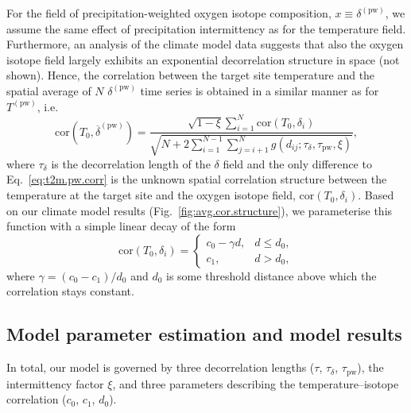 \documentclass[cp, manuscript, draft]{copernicus}
\begin{document}
For the field of precipitation-weighted oxygen isotope composition, $x \equiv
\delta^{\mathrm{(pw)}}$, we assume the same effect of precipitation
intermittency as for the temperature field. Furthermore, an analysis of the
climate model data suggests that also the oxygen isotope field largely exhibits
an exponential decorrelation structure in space (not shown). Hence, the
correlation between the target site temperature and the spatial average of $N$
$\delta^{\mathrm{(pw)}}$ time series is obtained in a similar manner as for
$T^{\mathrm{(pw)}}$, i.e.
%
\begin{equation}
\label{eq:oxy.pw.corr}
\mathrm{cor}\left(T_0,
  \overline{\delta}^{\mathrm{(pw)}}\right)=
\frac
{\sqrt{1-\xi}\sum_{i=1}^{N}\mathrm{cor}\left(T_0,\delta_i\right)}
{\sqrt{N + 2\sum_{i=1}^{N-1}\sum_{j=i+1}^{N}
  g(d_{ij}; \tau_{\delta}, \tau_{\mathrm{pw}}, \xi)}},
\end{equation}
%
where $\tau_{\delta}$ is the decorrelation length of the $\delta$ field and the
only difference to Eq.~\eqref{eq:t2m.pw.corr} is the unknown spatial correlation
structure between the temperature at the target site and the oxygen isotope
field, $\mathrm{cor}\left(T_0,\delta_i\right)$.  Based on our climate model
results (Fig.~\ref{fig:avg.cor.structure}), we parameterise this function with a
simple linear decay of the form
%
\begin{equation}
\label{eq:t2m.oxy.corr}
\mathrm{cor}\left(T_0,\delta_i\right)=
\begin{cases}
  c_0 - \gamma d, & d \le d_0,\\
  c_1, & d > d_0,
\end{cases}
\end{equation}
%
where $\gamma=(c_0-c_1)/d_0$ and $d_0$ is some threshold distance above which
the correlation stays constant.

\subsection{Model parameter estimation and model results}
\label{app:concept.model.estimation}

In total, our model is governed by three decorrelation lengths ($\tau$,
$\tau_{\delta}$, $\tau_{\mathrm{pw}}$), the intermittency factor $\xi$, and
three parameters describing the temperature--isotope correlation ($c_0$, $c_1$,
$d_0$).
\end{document}
